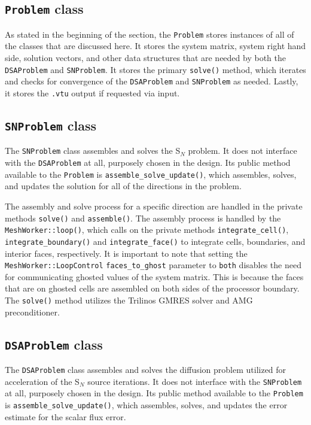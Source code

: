\documentclass{article}
\begin{document}
\subsection{\texttt{Problem} class}

As stated in the beginning of the section, the \texttt{Problem} stores instances of all of the classes that are discussed here. It stores the system matrix, system right hand side, solution vectors, and other data structures that are needed by both the \texttt{DSAProblem} and \texttt{SNProblem}. It stores the primary \texttt{solve()} method, which iterates and checks for convergence of the \texttt{DSAProblem} and \texttt{SNProblem} as needed. Lastly, it stores the \texttt{.vtu} output if requested via input.

\subsection{\texttt{SNProblem} class}

The \texttt{SNProblem} class assembles and solves the S$_N$ problem. It does not interface with the \texttt{DSAProblem} at all, purposely chosen in the design. Its public method available to the \texttt{Problem} is \texttt{assemble\_solve\_update()}, which assembles, solves, and updates the solution for all of the directions in the problem.

The assembly and solve process for a specific direction are handled in the private methods \texttt{solve()} and \texttt{assemble()}. The assembly process is handled by the \texttt{MeshWorker::loop()}, which calls on the private methods \texttt{integrate\_cell()}, \texttt{integrate\_boundary()} and \texttt{integrate\_face()} to integrate cells, boundaries, and interior faces, respectively. It is important to note that setting the \texttt{MeshWorker::LoopControl} \texttt{faces\_to\_ghost} parameter to \texttt{both} disables the need for communicating ghosted values of the system matrix. This is because the faces that are on ghosted cells are assembled on both sides of the processor boundary. The \texttt{solve()} method utilizes the Trilinos GMRES solver and AMG preconditioner.

\subsection{\texttt{DSAProblem} class}

The \texttt{DSAProblem} class assembles and solves the diffusion problem utilized for acceleration of the S$_N$ source iterations. It does not interface with the \texttt{SNProblem} at all, purposely chosen in the design. Its public method available to the \texttt{Problem} is \texttt{assemble\_solve\_update()}, which assembles, solves, and updates the error estimate for the scalar flux error. 
\end{document}
